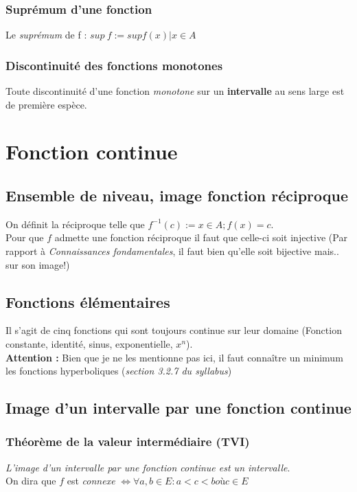 \documentclass[11pt, a4paper, openany]{book}
\begin{document}
\subsection{Suprémum d'une fonction}
Le \textit{suprémum} de f : $sup\ f := sup{f(x) | x \in A}$

\subsection{Discontinuité des fonctions monotones}
Toute discontinuité d'une fonction \textit{monotone} sur un \textbf{intervalle} au sens large est de première espèce.

\chapter{Fonction continue}
\section{Ensemble de niveau, image fonction réciproque}
On définit la réciproque telle que $f^{-1} (c) := {x \in A ; f(x) = c}$.\\
Pour que $f$ admette une fonction réciproque il faut que celle-ci soit injective (Par rapport à \textit{Connaissances fondamentales}, il faut bien qu'elle soit bijective mais.. sur son image!)

\section{Fonctions élémentaires}
Il s'agit de cinq fonctions qui sont toujours continue sur leur domaine (Fonction constante, identité, sinus, exponentielle, $x^{n}$).\\
\textbf{Attention :} Bien que je ne les mentionne pas ici, il faut connaître un minimum les fonctions hyperboliques (\textit{section 3.2.7 du syllabus})

\section{Image d'un intervalle par une fonction continue}

\subsection{Théorème de la valeur intermédiaire (TVI)}
\textit{L'image d'un intervalle par une fonction continue est un intervalle}.\\
On dira que $f$ est \textit{connexe} $\Leftrightarrow \forall a, b \in E : a < c < b où c \in E$\\\\
\end{document}

